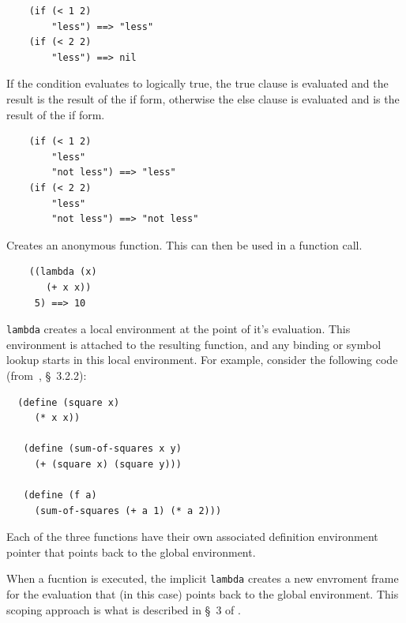 \documentclass[12pt]{article}
\begin{document}
\begin{verbatim}
    (if (< 1 2)
        "less") ==> "less"
    (if (< 2 2)
        "less") ==> nil
\end{verbatim}


If the condition evaluates to logically true, the true clause is
evaluated and the result is the result of the if form, otherwise the
else clause is evaluated and is the result of the if form.

\begin{verbatim}
    (if (< 1 2)
        "less"
        "not less") ==> "less"
    (if (< 2 2)
        "less"
        "not less") ==> "not less"
\end{verbatim}


Creates an anonymous function. This can then be used in a function call.

\begin{verbatim}
    ((lambda (x)
       (+ x x))
     5) ==> 10
\end{verbatim}

\verb|lambda| creates a local environment at the point of it's
evaluation. This environment is attached to the resulting function,
and any binding or symbol lookup starts in this local environment. For
example, consider the following code (from~\cite{Abelson85Structure}, \S~3.2.2):

\begin{verbatim}
  (define (square x)
     (* x x))

   (define (sum-of-squares x y)
     (+ (square x) (square y)))

   (define (f a)
     (sum-of-squares (+ a 1) (* a 2)))
\end{verbatim}

Each of the three functions have their own associated definition
environment pointer that points back to the global environment.

When a fucntion is executed, the implicit \verb|lambda| creates a new
envroment frame for the evaluation that (in this case) points back to
the global environment. This scoping approach is what is described in
\S~3 of \cite{Abelson85Structure}.
\end{document}
